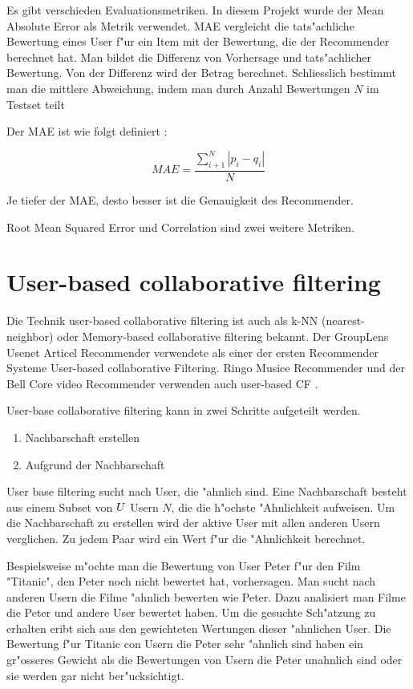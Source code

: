 \documentclass[a4paper, 12pt]{article}
\begin{document}
Es gibt verschieden Evaluationsmetriken. In diesem Projekt wurde der Mean Absolute Error als Metrik verwendet. MAE vergleicht die tats"achliche Bewertung eines User f"ur ein Item mit der Bewertung, die der Recommender berechnet hat. Man bildet die Differenz von Vorhersage und tats"achlicher Bewertung. Von der Differenz wird der Betrag berechnet. Schliesslich bestimmt man die mittlere Abweichung, indem man durch Anzahl Bewertungen $N$ im Testset teilt 

Der MAE ist wie folgt definiert \cite{sarwar01}:

\begin{equation}
  \label{eq:mae}
  MAE = \frac{\sum_{i+1}^N | p_i-q_i | }{N}
\end{equation}

Je tiefer der MAE, desto besser ist die Genauigkeit des Recommender.

Root Mean Squared Error und Correlation sind zwei weitere Metriken.

\section{User-based collaborative filtering}

Die Technik user-based collaborative filtering ist auch als k-NN (nearest-neighbor) oder Memory-based collaborative filtering bekannt. Der GroupLens Usenet Articel Recommender verwendete als einer der ersten Recommender Systeme User-based collaborative Filtering. Ringo Musice Recommender und der Bell Core video Recommender verwenden auch user-based CF .

User-base collaborative filtering kann in zwei Schritte aufgeteilt werden. 

\begin{enumerate}
\item Nachbarschaft erstellen
\item Aufgrund der Nachbarschaft 
\end{enumerate}

User base filtering sucht nach User, die "ahnlich sind. Eine Nachbarschaft besteht aus einem Subset von $ \mathnormal{U} $ Usern $N$, die die h"ochste "Ahnlichkeit aufweisen. Um die Nachbarschaft zu erstellen wird der aktive User mit allen anderen Usern verglichen. Zu jedem Paar wird ein Wert f"ur die "Ahnlichkeit berechnet.

Bespielsweise m"ochte man die Bewertung von User Peter f"ur den Film "Titanic", den Peter noch nicht bewertet hat, vorhersagen. Man sucht nach anderen Usern die Filme "ahnlich bewerten wie Peter. Dazu analisiert man Filme die Peter und andere User bewertet haben. Um die gesuchte Sch"atzung zu erhalten eribt sich aus den gewichteten Wertungen dieser "ahnlichen User. Die Bewertung f"ur Titanic con Usern die Peter sehr "ahnlich sind haben ein gr"osseres Gewicht als die Bewertungen von Usern die Peter unahnlich sind oder sie werden gar nicht ber"ucksichtigt.
\end{document}
